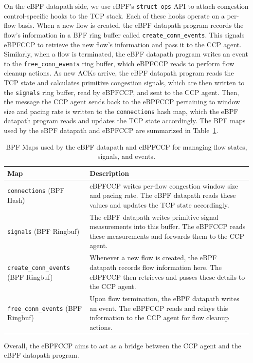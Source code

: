 \documentclass[../main.tex]{subfiles}
\begin{document}
On the eBPF datapath side, we use eBPF's \texttt{struct\_ops} API to attach congestion control-specific hooks to the TCP stack.
Each of these hooks operate on a per-flow basis.
When a new flow is created, the eBPF datapath program records the flow's information in a BPF ring buffer called \texttt{create\_conn\_events}.
This signals eBPFCCP to retrieve the new flow's information and pass it to the CCP agent.
Similarly, when a flow is terminated, the eBPF datapath program writes an event to the \texttt{free\_conn\_events} ring buffer, which eBPFCCP reads to perform flow cleanup actions.
As new ACKs arrive, the eBPF datapath program reads the TCP state and calculates primitive congestion signals, which are then written to the \texttt{signals} ring buffer, read by eBPFCCP, and sent to the CCP agent.
Then, the message the CCP agent sends back to the eBPFCCP pertaining to window size and pacing rate is written to the \texttt{connections} hash map, which the eBPF datapath program reads and updates the TCP state accordingly.
The BPF maps used by the eBPF datapath and eBPFCCP are summarized in Table~\ref{tab:maptable}.

\begin{table}[htbp]
    \centering
    \footnotesize
    \begin{tabular}{@{}p{} p{}@{}}
        \toprule
        \textbf{Map} & \textbf{Description} \\[3pt]
        \midrule
        \texttt{connections} (BPF Hash) &
        eBPFCCP writes per-flow congestion window size and pacing rate. 
        The eBPF datapath reads these values and updates the TCP state accordingly. \\[6pt]
        
        \texttt{signals} (BPF Ringbuf) &
        The eBPF datapath writes primitive signal measurements into this buffer. 
        The eBPFCCP reads these measurements and forwards them to the CCP agent. \\[6pt]
        
        \texttt{create\_conn\_events} (BPF Ringbuf) &
        Whenever a new flow is created, the eBPF datapath records flow information here. 
        The eBPFCCP then retrieves and passes these details to the CCP agent. \\[6pt]
        
        \texttt{free\_conn\_events} (BPF Ringbuf) &
        Upon flow termination, the eBPF datapath writes an event. 
        The eBPFCCP reads and relays this information to the CCP agent for flow cleanup actions. \\[3pt]
        \bottomrule
    \end{tabular}
    \caption{BPF Maps used by the eBPF datapath and eBPFCCP for managing flow states, signals, and events.}
    \label{tab:maptable}
\end{table}

Overall, the eBPFCCP aims to act as a bridge between the CCP agent and the eBPF datapath program.
\end{document}
